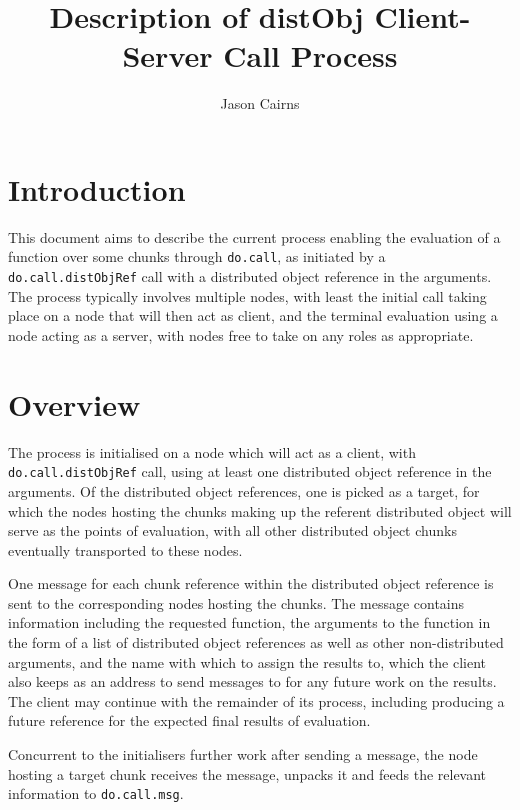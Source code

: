 \documentclass[a4paper,10pt]{article}
\begin{document}
\title{Description of distObj Client-Server Call Process}
\author{Jason Cairns}
  
\maketitle{}

\section{Introduction}
This document aims to describe the current process enabling the evaluation of a
function over some chunks through \texttt{do.call}, as initiated by a
\texttt{do.call.distObjRef} call with a distributed object reference
in the arguments.
The process typically involves multiple nodes, with least the initial call
taking place on a node that will then act as client, and the terminal
evaluation using a node acting as a server, with nodes free to take on any
roles as appropriate.

\section{Overview}

The process is initialised on a node which will act as a client, with
\texttt{do.call.distObjRef} call, using at least one distributed
object reference in the arguments.
Of the distributed object references, one is picked as a target, for which the
nodes hosting the chunks making up the referent distributed object will serve
as the points of evaluation, with all other distributed object chunks
eventually transported to these nodes.

One message for each chunk reference within the distributed object reference is
sent to the corresponding nodes hosting the chunks.
The message contains information including the requested function, the
arguments to the function in the form of a list of distributed object
references as well as other non-distributed arguments, and the name with which
to assign the results to, which the client also keeps as an address to send
messages to for any future work on the results.
The client may continue with the remainder of its process, including producing
a future reference for the expected final results of evaluation.

Concurrent to the initialisers further work after sending a message, the node
hosting a target chunk receives the message, unpacks it and feeds the relevant
information to \texttt{do.call.msg}.
\end{document}
